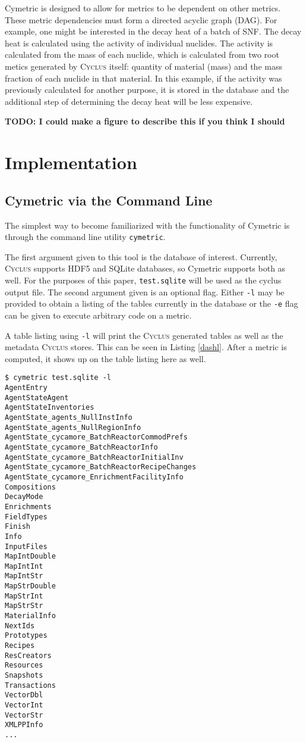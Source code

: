 \documentclass{anstrans}
\newcommand{\cyclus}{\textsc{Cyclus}\xspace}
\newcommand{\TODO}[1] {{\color{red}\textbf{TODO: #1}}}
\newcommand{\code}[1]{{\color{code}\texttt{#1}}}
\begin{document}
Cymetric is designed to allow for metrics to be dependent on other 
metrics. These metric dependencies must form a directed acyclic graph (DAG).
For example, one might be interested in the decay heat of a batch of 
\gls{SNF}. The decay heat is calculated using the activity of individual 
nuclides. The activity is calculated from the mass of each nuclide, which 
is calculated from two root metics generated by  \cyclus itself: quantity of 
material (mass) and the mass fraction of each nuclide in that material. 
In this example, if the activity was previously calculated for another 
purpose, it is stored in the database and the additional step of 
determining the decay heat will be less expensive. 

\TODO{I could make a figure to describe this if you think I should}

\section{Implementation}

\subsection{Cymetric via the Command Line}
The simplest way to become familiarized with the functionality of Cymetric 
is through the command line utility \code{cymetric}. 

The first argument given to this tool is the database of interest. 
Currently, \cyclus supports \gls{HDF5} and \gls{SQLite} databases, 
so Cymetric supports both as well. For the purposes of this paper, 
\code{test.sqlite} will be used as the cyclus output file. The second 
argument given is an optional flag. Either \code{-l} may be provided to obtain 
a listing of the tables currently in the database or the \code{-e} flag 
can be given to execute arbitrary code on a metric. 

A table listing using \code{-l} will print the \cyclus generated tables 
as well as the metadata \cyclus stores. This can be seen in Listing 
\ref{dashl}. After a metric is computed, it shows up on the table 
listing here as well. 

\begin{lstlisting}[caption ={List of Tables in a Database}, label=dashl]
$ cymetric test.sqlite -l
AgentEntry
AgentStateAgent
AgentStateInventories
AgentState_agents_NullInstInfo
AgentState_agents_NullRegionInfo
AgentState_cycamore_BatchReactorCommodPrefs
AgentState_cycamore_BatchReactorInfo
AgentState_cycamore_BatchReactorInitialInv
AgentState_cycamore_BatchReactorRecipeChanges
AgentState_cycamore_EnrichmentFacilityInfo
Compositions
DecayMode
Enrichments
FieldTypes
Finish
Info
InputFiles
MapIntDouble
MapIntInt
MapIntStr
MapStrDouble
MapStrInt
MapStrStr
MaterialInfo
NextIds
Prototypes
Recipes
ResCreators
Resources
Snapshots
Transactions
VectorDbl
VectorInt
VectorStr
XMLPPInfo
...
\end{lstlisting}
\end{document}
